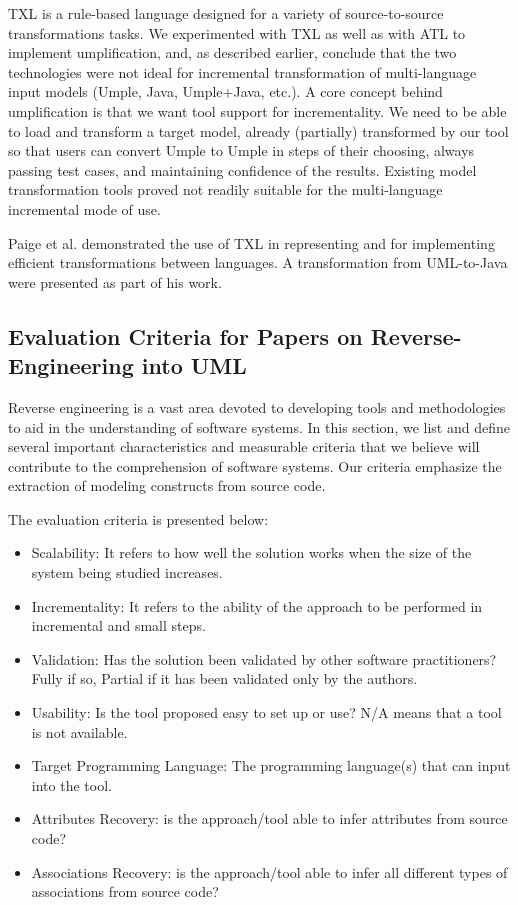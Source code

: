TXL \cite{Cordy2006} is a rule-based language designed for a variety of source-to-source transformations tasks. We experimented with TXL as well as with ATL to implement  umplification, and, as described earlier, conclude that the two technologies were not ideal for incremental transformation of multi-language input models (Umple, Java, Umple+Java, etc.). A core concept behind umplification is that we want tool support for incrementality. We need to be able to load and transform a target model, already (partially) transformed by our tool so that users can convert Umple to Umple in steps of their choosing, always passing test cases, and maintaining confidence of the results. Existing model transformation tools proved not readily suitable for the multi-language incremental mode of use.

Paige et al. \cite{paigetowards} demonstrated the use of TXL in representing and for implementing efficient transformations between languages. A transformation from UML-to-Java were presented as part of his work. 

\subsection{Evaluation Criteria for Papers on Reverse-Engineering into UML}

Reverse engineering is a vast area devoted to developing tools and methodologies to aid in the understanding of software systems. In this section, we list and define several important characteristics and measurable criteria that we believe will contribute to the comprehension of software systems. Our criteria emphasize the extraction of modeling constructs from source code.

The evaluation criteria is presented below: 
\begin{itemize}
\item Scalability:  It refers to how well the solution works when the size of the system being studied increases.
\item Incrementality: It refers to the ability of the approach to be performed in incremental and small steps.
\item Validation:  Has the solution been validated by other software practitioners? Fully if so, Partial if it has been validated only by the authors. 
\item Usability: Is the tool proposed easy to set up or use? N/A means that a tool is not available.
\item Target Programming Language: The programming language(s) that can input into the tool.
\item Attributes Recovery: is the approach/tool able to infer attributes from source code?
\item Associations Recovery: is the approach/tool able to infer all different types of associations from source code? 
\end{itemize}

